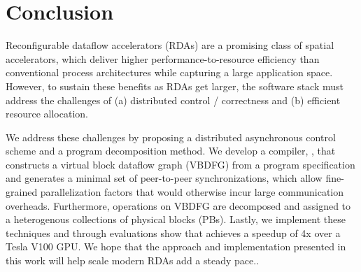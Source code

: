 \section{Conclusion}
\label{sec:conclusion}
Reconfigurable dataflow accelerators (RDAs) are a promising class of spatial accelerators, which deliver higher performance-to-resource efficiency than conventional process architectures while capturing a large application space.
However, to sustain these benefits as RDAs get larger, the software stack must address the challenges of (a) distributed control / correctness and (b) efficient resource allocation.

We address these challenges by proposing a distributed asynchronous control scheme and a program decomposition method. 
We develop a compiler, \name{}, that constructs a virtual block dataflow graph (VBDFG) from a program specification and generates a minimal set of peer-to-peer synchronizations, which allow fine-grained parallelization factors that would otherwise incur large communication overheads.
Furthermore, operations on VBDFG are decomposed and assigned to a heterogenous collections of physical blocks (PBs). 
Lastly, we implement these techniques and through evaluations show that \name{} achieves a speedup of 4x over a Tesla V100 GPU.
We hope that the approach and implementation presented in this work will help scale modern RDAs add a steady pace..

